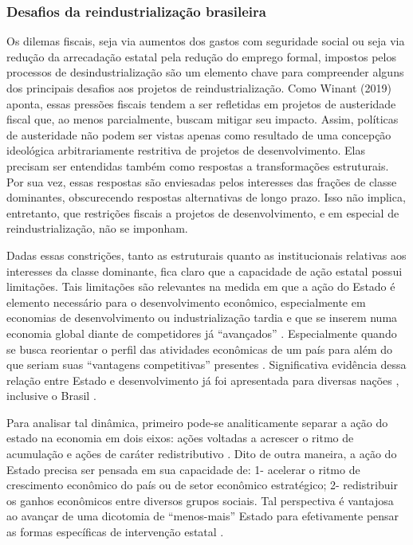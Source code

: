 \subsubsection{Desafios da reindustrialização brasileira}

Os dilemas fiscais, seja via aumentos dos gastos com seguridade social
ou seja via redução da arrecadação estatal pela redução do emprego
formal, impostos pelos processos de desindustrialização são um elemento
chave para compreender alguns dos principais desafios aos projetos de
reindustrialização. Como Winant (2019) aponta, essas pressões fiscais
tendem a ser refletidas em projetos de austeridade fiscal que, ao menos
parcialmente, buscam mitigar seu impacto. Assim, políticas de
austeridade não podem ser vistas apenas como resultado de uma concepção
ideológica arbitrariamente restritiva de projetos de desenvolvimento.
Elas precisam ser entendidas também como respostas a transformações
estruturais. Por sua vez, essas respostas são enviesadas pelos
interesses das frações de classe dominantes, obscurecendo respostas
alternativas de longo prazo. Isso não implica, entretanto, que
restrições fiscais a projetos de desenvolvimento, e em especial de
reindustrialização, não se imponham.

Dadas essas constrições, tanto as estruturais quanto as institucionais
relativas aos interesses da classe dominante, fica claro que a
capacidade de ação estatal possui limitações. Tais limitações são
relevantes na medida em que a ação do Estado é elemento necessário para
o desenvolvimento econômico, especialmente em economias de
desenvolvimento ou industrialização tardia e que se inserem numa
economia global diante de competidores já ``avançados'' . Especialmente quando se busca reorientar o perfil
das atividades econômicas de um país para além do que seriam suas
``vantagens competitivas'' presentes \citep{evans_embedded_1995}. Significativa
evidência dessa relação entre Estado e desenvolvimento já foi
apresentada para diversas nações , inclusive o Brasil \citep{evans_dependent_1979,perissinotto_ideias_2023}.

Para analisar tal dinâmica, primeiro pode-se analiticamente separar a
ação do estado na economia em dois eixos: ações voltadas a acrescer o
ritmo de acumulação e ações de caráter redistributivo . Dito de outra maneira, a ação do Estado precisa ser
pensada em sua capacidade de: 1- acelerar o ritmo de crescimento
econômico do país ou de setor econômico estratégico; 2- redistribuir os
ganhos econômicos entre diversos grupos sociais. Tal perspectiva é
vantajosa ao avançar de uma dicotomia de ``menos-mais'' Estado para
efetivamente pensar as formas específicas de intervenção estatal \citep{evans_embedded_1995}.


